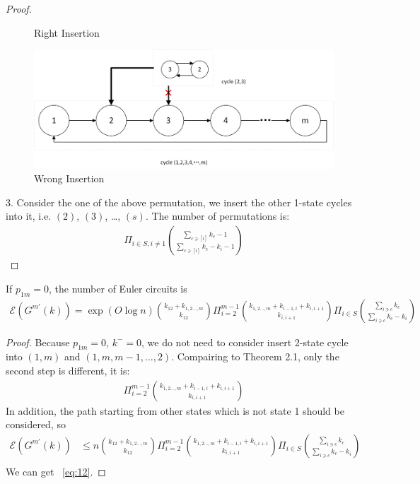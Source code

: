 \documentclass[11pt,en,cite=authoryear]{elegantpaper}
\begin{document}
\begin{proof}
\begin{figure}[h]
        \caption{Right Insertion}
    \end{figure}
    \begin{figure}[h] \label{fig:insert2} 
        \centering
        \includegraphics[scale=0.5]{insert2.png}
        \caption{Wrong Insertion}
    \end{figure}

    3. Consider the one of the  above permutation, we insert the other 1-state cycles into it, i.e. $(2)$, $(3)$, \dots, $(s)$.  The number of permutations is:
    \begin{align*}
        \Pi_{i\in S, i\neq 1} \binom{\sum_{c \ni [i]} k_{c} - 1}{\sum_{c \ni [i]} k_{c} - k_{i} - 1}
    \end{align*}
\end{proof}

\begin{corollary}
    If $p_{1m}=0$, the number of Euler circuits is 
    \begin{align} \label{eq:12}
        \mathcal{E} (G^{m'} (k))
        = \exp(O \log n)  \binom{k_{12}+k_{1,2\dots ,m}}{k_{12}} 
        \Pi_{i=2}^{m-1} \binom{k_{1,2\dots ,m}+ k_{i-1, i}+ k_{i, i+1}}{k_{i, i+1}}
        \Pi_{i \in S} \binom{\sum_{i\ni c} k_{c}}{\sum_{i\ni c} k_{c} - k_{i}}
    \end{align}
\end{corollary}
\begin{proof}
    Because $p_{1m}=0$, $k^-=0$, we do not need to consider insert 2-state cycle  into $(1,m)$ and $(1, m, m-1, \dots, 2)$. Compairing to Theorem 2.1, only the second step is different, it is:
    \begin{align*}
        \Pi_{i=2}^{m-1} \binom{k_{1,2\dots ,m}+ k_{i-1, i}+ k_{i, i+1}}{k_{i, i+1}}
    \end{align*}
    In addition, the path starting from other states which is not state 1 should be considered, so
    \begin{align*}
        \mathcal{E} (G^{m'} (k))
        &\le  n \binom{k_{12}+k_{1,2\dots ,m}}{k_{12}} 
        \Pi_{i=2}^{m-1} \binom{k_{1,2\dots ,m}+ k_{i-1, i}+ k_{i, i+1}}{k_{i, i+1}}
        \Pi_{i \in S} \binom{\sum_{i\ni c} k_{c}}{\sum_{i\ni c} k_{c} - k_{i}}\\
    \end{align*}
    We can get ~\ref{eq:12}.
\end{proof}
\end{document}
